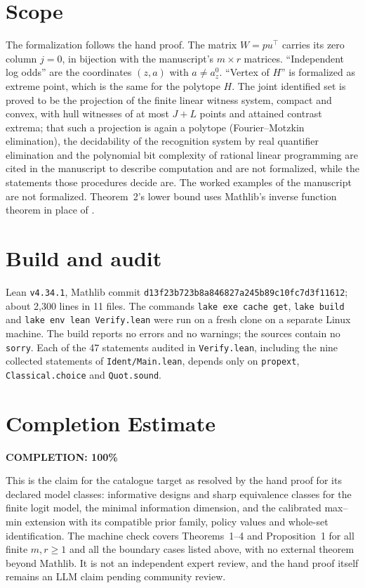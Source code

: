 \documentclass[11pt]{article}
\begin{document}
\section{Scope}

The formalization follows the hand proof. The matrix $W=pu^\top$ carries its zero column $j=0$, in bijection with the manuscript's $m\times r$ matrices. ``Independent log odds'' are the coordinates $(z,a)$ with $a\ne a^0_z$. ``Vertex of $H$'' is formalized as extreme point, which is the same for the polytope $H$. The joint identified set is proved to be the projection of the finite linear witness system, compact and convex, with hull witnesses of at most $J+L$ points and attained contrast extrema; that such a projection is again a polytope (Fourier--Motzkin elimination), the decidability of the recognition system by real quantifier elimination \cite{BPR} and the polynomial bit complexity of rational linear programming \cite{BTN} are cited in the manuscript to describe computation and are not formalized, while the statements those procedures decide are. The worked examples of the manuscript are not formalized. Theorem~2's lower bound uses Mathlib's inverse function theorem in place of \cite{Rudin}.

\section{Build and audit}

Lean \texttt{v4.34.1}, Mathlib commit \texttt{d13f23b723b8a846827a245b89c10fc7d3f11612}; about 2,300 lines in 11 files. The commands \texttt{lake exe cache get}, \texttt{lake build} and \texttt{lake env lean Verify.lean} were run on a fresh clone on a separate Linux machine. The build reports no errors and no warnings; the sources contain no \texttt{sorry}. Each of the 47 statements audited in \texttt{Verify.lean}, including the nine collected statements of \texttt{Ident/Main.lean}, depends only on \texttt{propext}, \texttt{Classical.choice} and \texttt{Quot.sound}.

\section{Completion Estimate}
\noindent\textbf{COMPLETION: 100\%}

This is the claim for the catalogue target as resolved by the hand proof for its declared model classes: informative designs and sharp equivalence classes for the finite logit model, the minimal information dimension, and the calibrated max--min extension with its compatible prior family, policy values and whole-set identification. The machine check covers Theorems~1--4 and Proposition~1 for all finite $m,r\ge1$ and all the boundary cases listed above, with no external theorem beyond Mathlib. It is not an independent expert review, and the hand proof itself remains an LLM claim pending community review.
\end{document}
